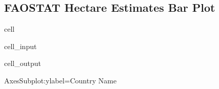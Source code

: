 \documentclass[letterpaper,10pt,english]{jupyterBook}
\begin{document}
\subsection{FAOSTAT Hectare Estimates Bar Plot}
\label{\detokenize{notebooks/data_exploration:faostat-hectare-estimates-bar-plot}}
\begin{sphinxuseclass}{cell}\begin{sphinxVerbatimInput}

\begin{sphinxuseclass}{cell_input}
\begin{sphinxVerbatim}[commandchars=\\\{\}]
        \PYG{p}{[}    \PYG{p}{]}         
\end{sphinxVerbatim}

\end{sphinxuseclass}\end{sphinxVerbatimInput}
\begin{sphinxVerbatimOutput}

\begin{sphinxuseclass}{cell_output}
\begin{sphinxVerbatim}[commandchars=\\\{\}]
\PYGZlt{}AxesSubplot:ylabel=\PYGZsq{}Country Name\PYGZsq{}\PYGZgt{}
\end{sphinxVerbatim}

\noindent{}

\end{sphinxuseclass}\end{sphinxVerbatimOutput}

\end{sphinxuseclass}
\end{document}
